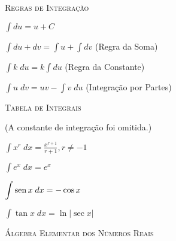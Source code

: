 \pagestyle{empty}

\setlength{\parindent}{0pt}
\setlength{\parskip}{2pt}

\textsc{Regras de Integração}

{\small
\begin{multicols}{2}
$\displaystyle \int du = u + C$

$\displaystyle \int du + dv = \int u +\int dv$ (Regra da Soma)

$\displaystyle \int k \; du = k \int du$ (Regra da Constante)

$\displaystyle \int u \; dv = uv - \int v \; du$ (Integração por Partes)
\end{multicols}
}

\textsc{Tabela de Integrais}

\def\dx{\;dx}

{\small
(A constante de integração foi omitida.)

\begin{multicols}{2}
$\displaystyle \int x^r \dx = \frac{x^{r+1}}{r+1}, r \ne -1$

$\displaystyle \int e^x \dx = e^x$

$\displaystyle \int \sen x \dx = - \cos x$

$\displaystyle \int \tan x \dx = \ln|\sec x|$
\end{multicols}
}

\newpage

\textsc{Álgebra Elementar dos Números Reais}

